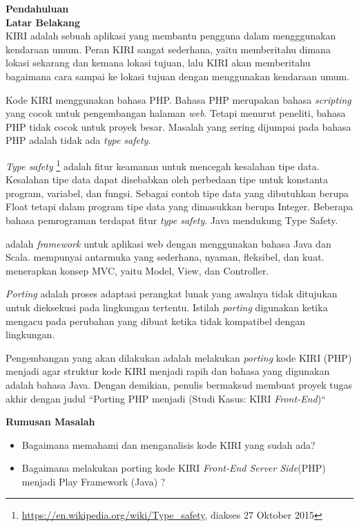 \documentclass[a4paper,twoside]{article}
\begin{document}
\begin{enumerate}
\textbf{Pendahuluan}\\

\textbf{Latar Belakang}\\

KIRI \cite{statickiri} adalah sebuah aplikasi yang membantu pengguna dalam mengggunakan kendaraan umum. Peran KIRI sangat sederhana, yaitu memberitahu dimana lokasi sekarang dan kemana lokasi tujuan, lalu KIRI akan memberitahu bagaimana cara sampai ke lokasi tujuan dengan menggunakan kendaraan umum. 

Kode KIRI \cite{githubkiri} menggunakan bahasa PHP. Bahasa PHP \cite{phpnet} merupakan bahasa \textit{scripting} yang cocok untuk pengembangan halaman \textit{web}. Tetapi menurut peneliti, bahasa PHP tidak cocok untuk proyek besar. Masalah yang sering dijumpai pada bahasa PHP adalah tidak ada \textit{type safety}. 

\textit{Type safety} \footnote{ \url{https://en.wikipedia.org/wiki/Type_safety}, diakses 27 Oktober 2015} adalah fitur keamanan untuk mencegah kesalahan tipe data. Kesalahan tipe data dapat disebabkan oleh perbedaan tipe untuk konstanta program, variabel, dan fungsi. Sebagai contoh tipe data yang dibutuhkan berupa Float tetapi dalam program tipe data yang dimasukkan berupa Integer. Beberapa bahasa pemrograman terdapat fitur \textit{type safety}. Java mendukung Type Safety.

\play adalah \textit{framework} untuk aplikasi web dengan menggunakan bahasa Java dan Scala. \play mempunyai antarmuka yang sederhana, nyaman, fleksibel, dan kuat. \play menerapkan konsep MVC, yaitu Model, View, dan Controller\cite{playforjava}. 

\textit{Porting} adalah proses adaptasi perangkat lunak yang awalnya tidak ditujukan untuk dieksekusi pada lingkungan tertentu. Istilah \textit{porting} digunakan ketika mengacu pada perubahan yang dibuat ketika tidak kompatibel dengan lingkungan.

Pengembangan yang akan dilakukan adalah melakukan \textit{porting} kode KIRI (PHP) menjadi \play agar struktur kode KIRI menjadi rapih dan bahasa yang digunakan adalah bahasa Java. Dengan demikian, penulis bermaksud membuat proyek tugas akhir dengan judul ``Porting PHP menjadi \play (Studi Kasus: KIRI \textit{Front-End})``

\textbf{Rumusan Masalah}
\begin{itemize}
	\item Bagaimana memahami dan menganalisis kode KIRI yang sudah ada?
	\item Bagaimana melakukan porting kode KIRI \textit{Front-End Server Side}(PHP) menjadi Play Framework (Java) ?
\end{itemize}


\end{enumerate}
\end{document}
